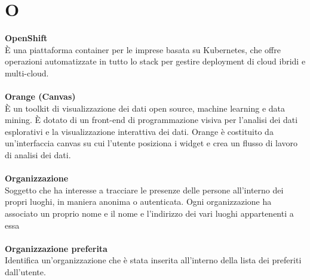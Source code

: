 \section{O}
\textbf{OpenShift}\\
È una piattaforma container per le imprese basata su Kubernetes, che offre operazioni automatizzate in tutto lo stack per gestire deployment di cloud ibridi e multi-cloud. \\ \\
\textbf{Orange (Canvas)}\\
È un toolkit di visualizzazione dei dati open source, machine learning e data mining. È dotato di un front-end di programmazione visiva per l'analisi dei dati esplorativi e la visualizzazione interattiva dei dati. Orange è costituito da un'interfaccia canvas su cui l'utente posiziona i widget e crea un flusso di lavoro di analisi dei dati. \\ \\
\textbf{Organizzazione}\\
Soggetto che ha interesse a tracciare le presenze delle persone all’interno dei propri luoghi, in maniera anonima o autenticata. Ogni organizzazione ha associato un proprio nome e il nome e l'indirizzo dei vari luoghi appartenenti a essa \\ \\
\textbf{Organizzazione preferita}\\
Identifica un'organizzazione che è stata inserita all'interno della lista dei preferiti dall'utente. \\ \\
\clearpage